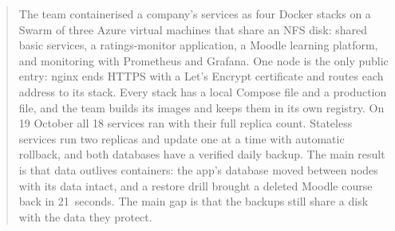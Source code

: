 \documentclass[informe,english]{practicaitic}
\begin{document}
\begin{abstract}
  The team containerised a company's services as four Docker stacks on a
  Swarm of three Azure virtual machines that share an NFS disk: shared
  basic services, a ratings-monitor application, a Moodle learning
  platform, and monitoring with Prometheus and Grafana. One node is the
  only public entry: nginx ends HTTPS with a Let's Encrypt certificate and
  routes each address to its stack. Every stack has a local Compose file
  and a production file, and the team builds its images and keeps them in
  its own registry. On 19 October all 18 services ran with their full
  replica count. Stateless services run two replicas and update one at a
  time with automatic rollback, and both databases have a verified daily
  backup.
  The main result is that data outlives containers: the app's database
  moved between nodes with its data intact, and a restore drill brought
  a deleted Moodle course back in 21~seconds. The main gap is that the
  backups still share a disk with the data they protect.
\end{abstract}















\printbibliography[heading=bibintoc]
\end{document}
